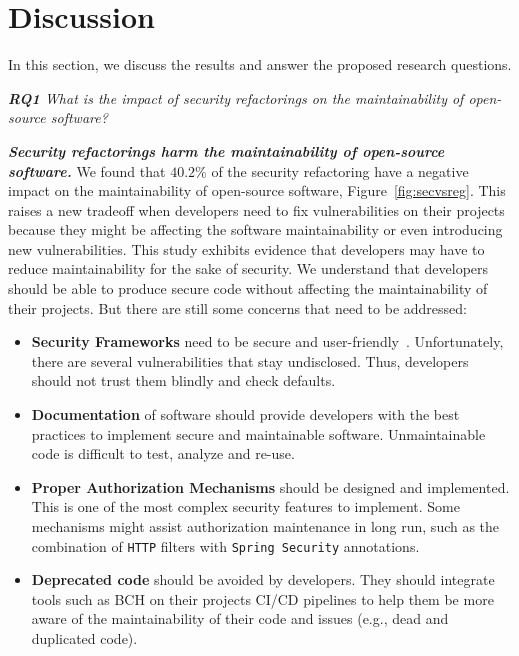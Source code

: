 \documentclass[10pt,conference]{IEEEtran}
\begin{document}
{\section{Discussion}\label{sec:discussion}

In this section, we discuss the results and answer the proposed research questions.

\begin{framed}
\textit{\textbf{RQ1} What is the impact of security refactorings on the maintainability
of open-source software?}
\end{framed}

\textbf{\textit{Security refactorings harm the maintainability of open-source software.}}
%
We found that $40.2\%$ of the security refactoring have a negative impact on the
maintainability of open-source software, Figure~\ref{fig:secvsreg}. This raises
a new tradeoff when developers need to fix vulnerabilities on their projects
because they might be affecting the software maintainability or even introducing
new vulnerabilities. This study exhibits evidence that developers may have to
reduce maintainability for the sake of security. We understand that developers
should be able to produce secure code without affecting the maintainability of
their projects. But there are still some concerns that need to be addressed:
\begin{itemize}
	\item \textbf{Security Frameworks} need to be secure and
	user-friendly~\cite{5287006, 7676144}. Unfortunately, there are several
	vulnerabilities that stay undisclosed. Thus, developers should not trust them
	blindly and check defaults.

	\item \textbf{Documentation} of software should provide developers with the
	best practices to implement secure and maintainable software. Unmaintainable
	code is difficult to test, analyze and re-use.

	\item \textbf{Proper Authorization Mechanisms} should be designed and
	implemented. This is one of the most complex security features to implement.
	Some mechanisms might assist authorization maintenance in long run, such as
	the combination of \texttt{HTTP} filters with \texttt{Spring Security}
	annotations.

	\item \textbf{Deprecated code} should be avoided by developers. They should
	integrate tools such as BCH on their projects CI/CD pipelines to help them be
	more aware of the maintainability of their code and issues (e.g., dead and
	duplicated code).


\end{itemize}}
\end{document}
